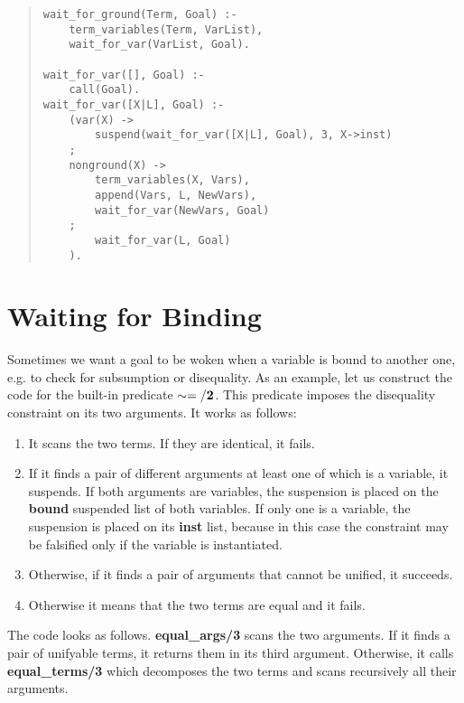 \begin{quote}
\begin{verbatim}
wait_for_ground(Term, Goal) :-
    term_variables(Term, VarList),
    wait_for_var(VarList, Goal).

wait_for_var([], Goal) :-
    call(Goal).
wait_for_var([X|L], Goal) :-
    (var(X) ->
        suspend(wait_for_var([X|L], Goal), 3, X->inst)
    ;
    nonground(X) ->
        term_variables(X, Vars),
        append(Vars, L, NewVars),
        wait_for_var(NewVars, Goal)
    ;
        wait_for_var(L, Goal)
    ).
\end{verbatim}
\end{quote}


\section{Waiting for Binding}
Sometimes we want a goal to be woken when a variable is bound
to another one, e.g. to check for
subsumption or disequality.
As an example, let us construct the code for the built-in predicate
${\bf \sim=/2}$.
This predicate imposes the disequality constraint on its two arguments.
It works as follows:
\begin{enumerate}
\item It scans the two terms.
If they are identical, it fails.

\item If it finds a pair of different arguments at least one of which is a
variable, it suspends. If both arguments are variables,
the suspension is placed on the {\bf bound} suspended list
of both variables.
If only one is a variable, the suspension is placed on its {\bf inst}
list, because in this case the constraint may be falsified
only if the variable is instantiated.

\item Otherwise, if it finds a pair of arguments that cannot be unified,
it succeeds.

\item Otherwise it means that the two terms are equal and it fails.
\end{enumerate}

The code looks as follows. {\bf equal_args/3} scans the two
arguments.
If it finds a pair of unifyable terms, it returns them in
its third argument.
Otherwise, it calls {\bf equal_terms/3} which decomposes
the two terms and scans recursively all their arguments.

